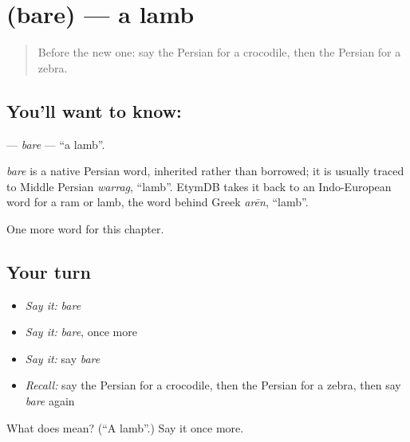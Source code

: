 \section[\texorpdfstring{\fa{بره} (bare)}{بره (bare)}]{ (bare) — a lamb}

\label{lesson:FA-C209-bare}



\begin{quote}
Before the new one: say the Persian for a crocodile, then the Persian for a zebra.
\end{quote}

\subsection*{You'll want to know: }
\textbf{} — \emph{bare} — \textquotedblleft{}a lamb\textquotedblright{}.

\begin{cousinweb}
\emph{bare} is a native Persian word, inherited rather than borrowed; it is usually traced to Middle Persian \emph{warrag}, \textquotedblleft{}lamb\textquotedblright{}. EtymDB takes it back to an Indo-European word for a ram or lamb, the word behind Greek \emph{arēn}, \textquotedblleft{}lamb\textquotedblright{}.
\end{cousinweb}

\begin{grammarlens}[title={What you've built}]
One more word for this chapter.
\end{grammarlens}

\subsection*{Your turn}
\begin{itemize}
\raggedright
  \item \emph{Say it:} \emph{bare}
  \item \emph{Say it:} \emph{bare}, once more
  \item \emph{Say it:} say \emph{bare}
  \item \emph{Recall:} say the Persian for a crocodile, then the Persian for a zebra, then say \emph{bare} again
\end{itemize}

\begin{tcolorbox}[breakable,colback=teal!4,colframe=teal!35!black,title={Before you move on}]
What does  mean? (\textquotedblleft{}A lamb\textquotedblright{}.) Say it once more.
\end{tcolorbox}
